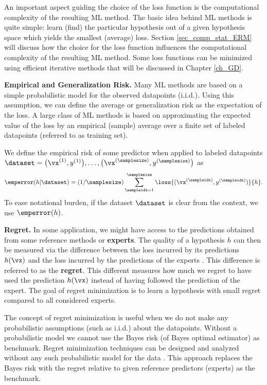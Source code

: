 \documentclass[12pt]{report}
\begin{document}
An important aspect guiding the choice of the loss function is the 
computational complexity of the resulting ML method. The basic 
idea behind ML methods is quite simple: learn (find) the particular 
hypothesis out of a given hypothesis space which yields the smallest 
(average) loss. Section \ref{sec_comp_stat_ERM} will discuss how  
the choice for the loss function influences the computational complexity 
of the resulting ML method. Some loss functions can be minimized using 
efficient iterative methods that will be discussed in Chapter \ref{ch_GD}. 


{\bf Empirical and Generalization Risk.} 
Many ML methods are based on a simple probabilistic model for the 
observed datapoints (i.i.d.). Using this assumption, we can define the 
average or generalization risk as the expectation of the loss. A large class 
of ML methods is based on approximating the expected value of the loss 
by an empirical (sample) average over a finite set of labeled datapoints 
(referred to as training set). 

We define the empirical risk of some predictor when applied to labeled datapoints $\dataset=\big(\vx^{(1)},y^{(1)}\big),\ldots,\big(\vx^{(\samplesize)},y^{(\samplesize)}\big)$ 
as 
\begin{equation} 
\label{eq_def_emp_error_101}
\emperror(h|\dataset) = (1/\samplesize)\sum_{\sampleidx=1}^{\samplesize} \loss{(\vx^{(\sampleidx)},y^{(\sampleidx)})}{h}.  
\end{equation} 
To ease notational burden, if the dataset $\dataset$ is clear from the context, 
we use $\emperror(h)$. 

{\bf Regret.} In some application, we might have access to the 
predictions obtained from some reference methods or {\bf experts}. 
The quality of a hypothesis $h$ can then be measured via the 
difference between the loss incurred by its predictions 
$h(\vx)$ and the loss incurred by the predictions of the experts 
\cite{HazanOCO}. This difference is referred to as the {\bf regret}. 
This different measures how much we regret to have used the 
prediction $h(\vx)$ instead of having followed the prediction of the expert. 
The goal of regret minimization is to learn a hypothesis 
with small regret compared to all considered experts. 

The concept of regret minimization is useful when we do 
not make any probabilistic assumptions (such as i.i.d.) about 
the datapoints. Without a probabilistic model we cannot use 
the Bayes risk (of Bayes optimal estimator) as benchmark. 
Regret minimization techniques can be designed and analyzed 
without any such probabilistic model for the data \cite{PredictionLearningGames}. 
This approach replaces the Bayes risk with the regret relative to 
given reference predictors (experts) as the benchmark. 
\end{document}
